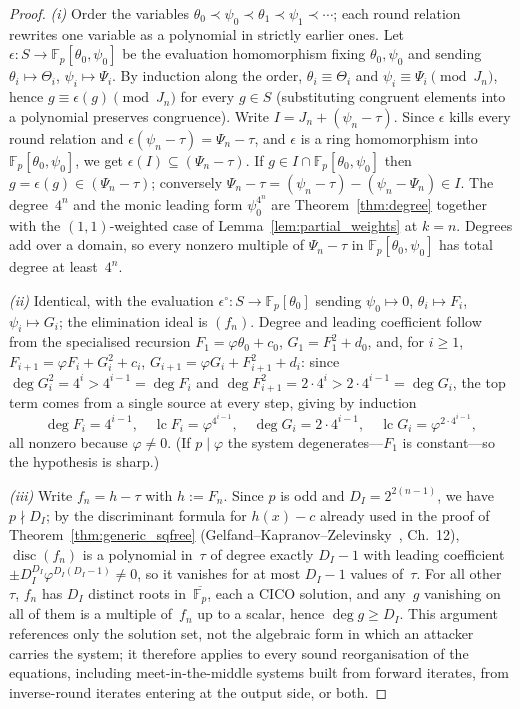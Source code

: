 \documentclass[11pt,a4paper]{article}
\theoremstyle{definition}
\newcommand{\Fp}{\mathbb{F}_p}
\begin{document}
\begin{proof}
\emph{(i)} Order the variables
$\theta_0 \prec \psi_0 \prec \theta_1 \prec \psi_1 \prec \cdots$; each
round relation rewrites one variable as a polynomial in strictly
earlier ones. Let $\epsilon : S \to \Fp[\theta_0, \psi_0]$ be the
evaluation homomorphism fixing $\theta_0, \psi_0$ and sending
$\theta_i \mapsto \Theta_i$, $\psi_i \mapsto \Psi_i$. By induction
along the order, $\theta_i \equiv \Theta_i$ and
$\psi_i \equiv \Psi_i \pmod{J_n}$, hence
$g \equiv \epsilon(g) \pmod{J_n}$ for every $g \in S$ (substituting
congruent elements into a polynomial preserves congruence). Write
$I = J_n + (\psi_n - \tau)$. Since $\epsilon$ kills every round
relation and $\epsilon(\psi_n - \tau) = \Psi_n - \tau$, and $\epsilon$
is a ring homomorphism into $\Fp[\theta_0, \psi_0]$, we get
$\epsilon(I) \subseteq (\Psi_n - \tau)$. If
$g \in I \cap \Fp[\theta_0, \psi_0]$ then
$g = \epsilon(g) \in (\Psi_n - \tau)$; conversely
$\Psi_n - \tau = (\psi_n - \tau) - (\psi_n - \Psi_n) \in I$. The
degree~$4^n$ and the monic leading form $\psi_0^{4^n}$ are
Theorem~\ref{thm:degree} together with the $(1,1)$-weighted case of
Lemma~\ref{lem:partial_weights} at $k = n$. Degrees add over a domain,
so every nonzero multiple of $\Psi_n - \tau$ in
$\Fp[\theta_0, \psi_0]$ has total degree at least~$4^n$.

\emph{(ii)} Identical, with the evaluation
$\epsilon^{\circ} : S \to \Fp[\theta_0]$ sending $\psi_0 \mapsto 0$,
$\theta_i \mapsto F_i$, $\psi_i \mapsto G_i$; the elimination ideal is
$(f_n)$. Degree and leading coefficient follow from the specialised
recursion $F_1 = \varphi \theta_0 + c_0$, $G_1 = F_1^2 + d_0$, and,
for $i \ge 1$, $F_{i+1} = \varphi F_i + G_i^2 + c_i$,
$G_{i+1} = \varphi G_i + F_{i+1}^2 + d_i$: since
$\deg G_i^2 = 4^{i} > 4^{i-1} = \deg F_i$ and
$\deg F_{i+1}^2 = 2 \cdot 4^{i} > 2 \cdot 4^{i-1} = \deg G_i$, the top
term comes from a single source at every step, giving by induction
\[
  \deg F_i = 4^{i-1}, \quad
  \operatorname{lc} F_i = \varphi^{4^{i-1}}, \quad
  \deg G_i = 2 \cdot 4^{i-1}, \quad
  \operatorname{lc} G_i = \varphi^{2 \cdot 4^{i-1}},
\]
all nonzero because $\varphi \ne 0$. (If $p \mid \varphi$ the system
degenerates---$F_1$ is constant---so the hypothesis is sharp.)

\emph{(iii)} Write $f_n = h - \tau$ with $h := F_n$. Since $p$ is odd
and $D_I = 2^{2(n-1)}$, we have $p \nmid D_I$; by the discriminant
formula for $h(x) - c$ already used in the proof of
Theorem~\ref{thm:generic_sqfree}
(Gelfand--Kapranov--Zelevinsky~\cite{GKZ1994}, Ch.~12),
$\operatorname{disc}(f_n)$ is a polynomial in~$\tau$ of degree exactly
$D_I - 1$ with leading coefficient
$\pm D_I^{D_I} \varphi^{D_I(D_I - 1)} \ne 0$, so it vanishes for at
most $D_I - 1$ values of~$\tau$. For all other~$\tau$, $f_n$ has $D_I$
distinct roots in~$\overline{\Fp}$, each a CICO solution, and any~$g$
vanishing on all of them is a multiple of~$f_n$ up to a scalar, hence
$\deg g \ge D_I$. This argument references only the solution set, not
the algebraic form in which an attacker carries the system; it
therefore applies to every sound reorganisation of the equations,
including meet-in-the-middle systems built from forward iterates,
from inverse-round iterates entering at the output side, or both.


\end{proof}
\end{document}
